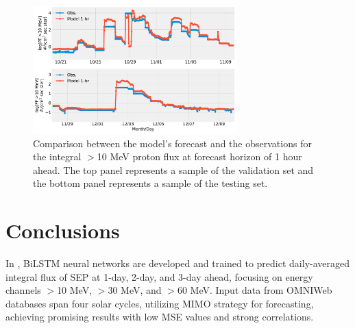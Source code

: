 \begin{table}[!htp]
	\centering
	\caption{The MSE/MAE for the validation and test sets over six forecasting windows.}
	\label{tab:my-table}
\end{table}

\begin{figure}[!htp]
	\centering
	\includegraphics[width=0.7\textwidth]{chapter4/figs/hourly_PF10/sample_valandtestsets_2003.pdf}
	\caption{Comparison between the model’s forecast and the observations for the integral $>$10 MeV proton flux at forecast horizon of 1 hour ahead. The top panel represents a sample of the validation set and the bottom panel represents a sample of the testing set.}
	\label{fig_sample_pf10_hr}
\end{figure}

\section{Conclusions}
In \citet{mnedal_2023a}, BiLSTM neural networks are developed and trained to predict daily-averaged integral flux of SEP at 1-day, 2-day, and 3-day ahead, focusing on energy channels $>$10 MeV, $>$30 MeV, and $>$60 MeV. Input data from OMNIWeb databases span four solar cycles, utilizing MIMO strategy for forecasting, achieving promising results with low MSE values and strong correlations.

